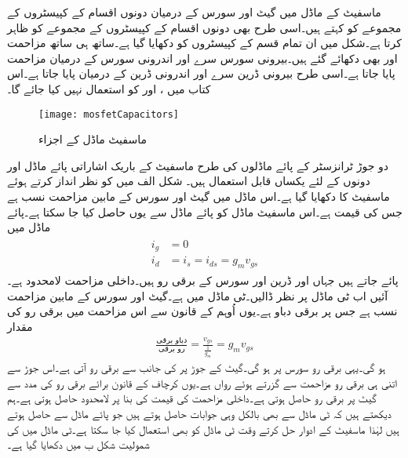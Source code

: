 ماسفیٹ کے ماڈل میں  گیٹ اور سورس کے درمیان دونوں اقسام کے کپیسٹروں کے مجموعے کو کہتے ہیں۔اسی طرح  بھی دونوں اقسام کے کپیسٹروں کے مجموعے کو ظاہر کرتا ہے۔شکل  میں ان تمام قسم کے کپیسٹروں کو دکھایا گیا ہے۔ساتھ ہی ساتھ مزاحمت  اور  بھی دکھائے گئے ہیں۔بیرونی سورس سرے اور اندرونی سورس کے درمیان  مزاحمت پایا جاتا ہے۔اسی طرح بیرونی ڈرین سرے اور اندرونی ڈرین کے درمیان  پایا جاتا ہے۔اس کتاب میں ،  اور  کو  استعمال نہیں کیا جائے گا۔
\begin{figure}
\centering
\texttt{[image: mosfetCapacitors]}
\caption{ماسفیٹ ماڈل کے اجزاء}
\label{شکل_ماسفیٹ_ماڈل_اجزاء}
\end{figure}

دو جوڑ ٹرانزسٹر کے پائے ماڈلوں کی طرح ماسفیٹ کے باریک اشاراتی پائے ماڈل  اور  دونوں کے لئے یکساں قابل استعمال ہیں۔
شکل  الف میں  کو نظر انداز کرتے ہوئے ماسفیٹ کا  دکھایا گیا ہے۔اس ماڈل میں گیٹ اور سورس کے مابین مزاحمت نسب ہے جس کی قیمت  ہے۔اس ماسفیٹ ماڈل کو پائے ماڈل سے یوں حاصل کیا جا سکتا ہے۔پائے ماڈل میں
\begin{gather} 
\begin{aligned}\label{مساوات_ماسفیٹ_ٹی_ماڈل_کے_برقی_رو}
i_g&=0\\
i_d&=i_s=i_{ds}=g_m v_{gs}
\end{aligned}
\end{gather}
پائے جاتے ہیں جہاں  اور  ڈرین اور سورس کے برقی رو ہیں۔داخلی مزاحمت لامحدود ہے۔آئیں اب ٹی ماڈل پر نظر ڈالیں۔ٹی ماڈل میں  ہے۔گیٹ اور سورس کے مابین مزاحمت نسب ہے جس پر برقی دباو  ہے۔یوں اُوہم کے قانون سے اس مزاحمت میں برقی رو کی مقدار
\begin{align*}
\frac{\textrm{دباو برقی}}{\textrm{رو برقی}}=\frac{v_{gs}}{\frac{1}{g_m}}=g_m v_{gs}
\end{align*} 
ہو گی۔یہی برقی رو سورس پر ہو گی۔گیٹ  کے جوڑ پر  کی جانب سے  برقی رو آتی ہے۔اس جوڑ سے اتنی ہی برقی رو مزاحمت سے گزرتے ہوئے  رواں ہے۔یوں کرچاف کے قانون برائے برقی رو کی مدد سے گیٹ  پر برقی رو  حاصل ہوتی ہے۔داخلی مزاحمت  کی قیمت  کی بنا پر لامحدود حاصل ہوتی ہے۔ہم دیکھتے ہیں کہ ٹی ماڈل سے بھی بالکل وہی جوابات حاصل ہوتے ہیں جو پائے ماڈل سے حاصل ہوتے ہیں لہٰذا ماسفیٹ کے ادوار حل کرتے وقت ٹی ماڈل کو بھی استعمال کیا جا سکتا ہے۔ٹی ماڈل میں  کی شمولیت شکل  ب میں دکھایا گیا ہے۔ 

